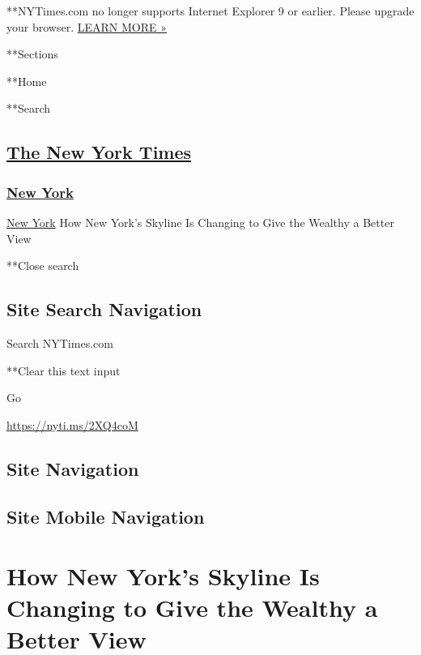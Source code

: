  **NYTimes.com no longer supports Internet Explorer 9 or earlier. Please
upgrade your browser.
\href{http://www.nytimes3xbfgragh.onion/content/help/site/ie9-support.html}{LEARN
MORE »}

**Sections

**Home

**Search

\hypertarget{the-new-york-times}{%
\subsection{\texorpdfstring{\href{http://www.nytimes3xbfgragh.onion/}{The
New York Times}}{The New York Times}}\label{the-new-york-times}}

\hypertarget{-new-york-}{%
\subsubsection{\texorpdfstring{ \href{/section/nyregion}{New York}
}{ New York }}\label{-new-york-}}

 \href{/section/nyregion}{New York} \textbar{}How New York's Skyline Is
Changing to Give the Wealthy a Better View

**Close search

\hypertarget{site-search-navigation}{%
\subsection{Site Search Navigation}\label{site-search-navigation}}

Search NYTimes.com

**Clear this text input

Go

\url{https://nyti.ms/2XQ4coM}

\hypertarget{site-navigation}{%
\subsection{Site Navigation}\label{site-navigation}}

\hypertarget{site-mobile-navigation}{%
\subsection{Site Mobile Navigation}\label{site-mobile-navigation}}

\hypertarget{how-new-yorks-skyline-is-changing-to-give-the-wealthy-a-better-view}{%
\section{How New York's Skyline Is Changing to Give the Wealthy a Better
View}\label{how-new-yorks-skyline-is-changing-to-give-the-wealthy-a-better-view}}

